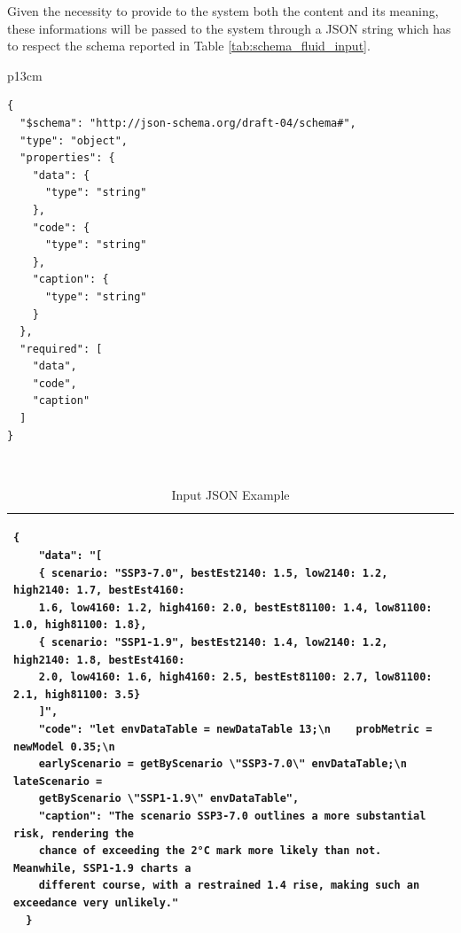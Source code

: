 Given the necessity to provide to the system both the content and its meaning, these informations will be passed to the system through a JSON string which has to respect the schema reported in Table \ref{tab:schema_fluid_input}.

\begin{table}[!ht]
    \centering
    \caption{Input JSON Schema \label{tab:schema_fluid_input}}
    \begin{tabular}{p{13cm}}
    \hline
    \hline
    \begin{verbatim}
{
  "$schema": "http://json-schema.org/draft-04/schema#",
  "type": "object",
  "properties": {
    "data": {
      "type": "string"
    },
    "code": {
      "type": "string"
    },
    "caption": {
      "type": "string"
    }
  },
  "required": [
    "data",
    "code",
    "caption"
  ]
}
    \end{verbatim}\\
    \hline \hline
    \end{tabular}
\end{table}

\begin{table}[!ht]
    \centering
    \caption{Input JSON Example \label{tab:json_fluid_input}}
    \begin{tabular}{p{13cm}}
    \hline
    \hline
    \begin{verbatim}
{
    "data": "[
    { scenario: "SSP3-7.0", bestEst2140: 1.5, low2140: 1.2, high2140: 1.7, bestEst4160:
    1.6, low4160: 1.2, high4160: 2.0, bestEst81100: 1.4, low81100: 1.0, high81100: 1.8},
    { scenario: "SSP1-1.9", bestEst2140: 1.4, low2140: 1.2, high2140: 1.8, bestEst4160:
    2.0, low4160: 1.6, high4160: 2.5, bestEst81100: 2.7, low81100: 2.1, high81100: 3.5}
    ]",
    "code": "let envDataTable = newDataTable 13;\n    probMetric = newModel 0.35;\n
    earlyScenario = getByScenario \"SSP3-7.0\" envDataTable;\n    lateScenario =
    getByScenario \"SSP1-1.9\" envDataTable",
    "caption": "The scenario SSP3-7.0 outlines a more substantial risk, rendering the
    chance of exceeding the 2°C mark more likely than not. Meanwhile, SSP1-1.9 charts a
    different course, with a restrained 1.4 rise, making such an exceedance very unlikely."
  }
\end{verbatim}\\
    \hline \hline
    \end{tabular}
\end{table}

